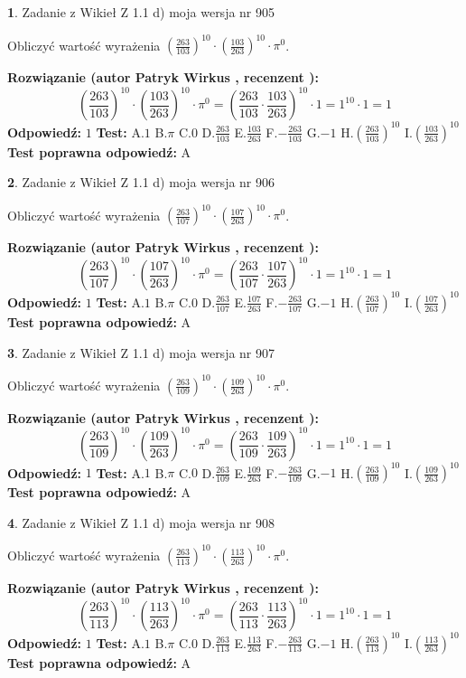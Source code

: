 \documentclass[12pt, a4paper]{article}
\theoremstyle{definition} %
\newtheorem{zad}{}
\newcommand{\zadStart}[1]{\begin{zad}#1\newline}
\newcommand{\zadStop}{\end{zad}}
\newcommand{\rozwStart}[2]{\noindent \textbf{Rozwiązanie (autor #1 , recenzent #2): }\newline}
\newcommand{\rozwStop}{\newline}
\newcommand{\odpStart}{\noindent \textbf{Odpowiedź:}\newline}
\newcommand{\odpStop}{\newline}
\newcommand{\testStart}{\noindent \textbf{Test:}\newline}
\newcommand{\testStop}{\newline}
\newcommand{\kluczStart}{\noindent \textbf{Test poprawna odpowiedź:}\newline}
\newcommand{\kluczStop}{\newline}
\begin{document}
\zadStart{Zadanie z Wikieł Z 1.1 d) moja wersja nr 905}

Obliczyć wartość wyrażenia $(\frac{263}{103})^{10} \cdot (\frac{103}{263})^{10} \cdot \pi^{0}$.
\zadStop
\rozwStart{Patryk Wirkus}{}
$$(\frac{263}{103})^{10} \cdot (\frac{103}{263})^{10} \cdot \pi^{0} = (\frac{263}{103} \cdot \frac{103}{263})^{10} \cdot 1 = 1^{10} \cdot 1 = 1$$
\rozwStop
\odpStart
$1$
\odpStop
\testStart
A.$1$ B.$\pi$ C.$0$ D.$\frac{263}{103}$ E.$\frac{103}{263}$
F.$-\frac{263}{103}$ G.$-1$
H.$(\frac{263}{103})^{10}$
I.$(\frac{103}{263})^{10}$
\testStop
\kluczStart
A
\kluczStop



\zadStart{Zadanie z Wikieł Z 1.1 d) moja wersja nr 906}

Obliczyć wartość wyrażenia $(\frac{263}{107})^{10} \cdot (\frac{107}{263})^{10} \cdot \pi^{0}$.
\zadStop
\rozwStart{Patryk Wirkus}{}
$$(\frac{263}{107})^{10} \cdot (\frac{107}{263})^{10} \cdot \pi^{0} = (\frac{263}{107} \cdot \frac{107}{263})^{10} \cdot 1 = 1^{10} \cdot 1 = 1$$
\rozwStop
\odpStart
$1$
\odpStop
\testStart
A.$1$ B.$\pi$ C.$0$ D.$\frac{263}{107}$ E.$\frac{107}{263}$
F.$-\frac{263}{107}$ G.$-1$
H.$(\frac{263}{107})^{10}$
I.$(\frac{107}{263})^{10}$
\testStop
\kluczStart
A
\kluczStop



\zadStart{Zadanie z Wikieł Z 1.1 d) moja wersja nr 907}

Obliczyć wartość wyrażenia $(\frac{263}{109})^{10} \cdot (\frac{109}{263})^{10} \cdot \pi^{0}$.
\zadStop
\rozwStart{Patryk Wirkus}{}
$$(\frac{263}{109})^{10} \cdot (\frac{109}{263})^{10} \cdot \pi^{0} = (\frac{263}{109} \cdot \frac{109}{263})^{10} \cdot 1 = 1^{10} \cdot 1 = 1$$
\rozwStop
\odpStart
$1$
\odpStop
\testStart
A.$1$ B.$\pi$ C.$0$ D.$\frac{263}{109}$ E.$\frac{109}{263}$
F.$-\frac{263}{109}$ G.$-1$
H.$(\frac{263}{109})^{10}$
I.$(\frac{109}{263})^{10}$
\testStop
\kluczStart
A
\kluczStop



\zadStart{Zadanie z Wikieł Z 1.1 d) moja wersja nr 908}

Obliczyć wartość wyrażenia $(\frac{263}{113})^{10} \cdot (\frac{113}{263})^{10} \cdot \pi^{0}$.
\zadStop
\rozwStart{Patryk Wirkus}{}
$$(\frac{263}{113})^{10} \cdot (\frac{113}{263})^{10} \cdot \pi^{0} = (\frac{263}{113} \cdot \frac{113}{263})^{10} \cdot 1 = 1^{10} \cdot 1 = 1$$
\rozwStop
\odpStart
$1$
\odpStop
\testStart
A.$1$ B.$\pi$ C.$0$ D.$\frac{263}{113}$ E.$\frac{113}{263}$
F.$-\frac{263}{113}$ G.$-1$
H.$(\frac{263}{113})^{10}$
I.$(\frac{113}{263})^{10}$
\testStop
\kluczStart
A
\kluczStop
\end{document}
